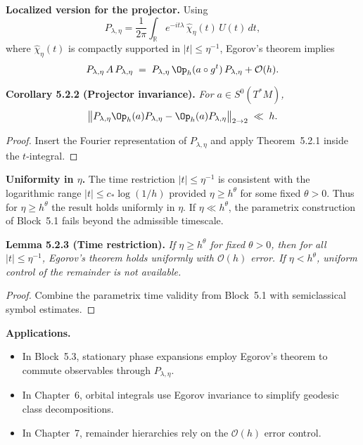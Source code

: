 \medskip

\noindent\textbf{Localized version for the projector.}
Using
\[
   P_{\lambda,\eta} = \frac{1}{2\pi}\int_{\mathbb{R}} e^{-it\lambda}\,
   \widehat{\chi}_\eta(t)\, U(t)\,dt,
\]
where $\widehat{\chi}_\eta(t)$ is compactly supported in $|t|\le \eta^{-1}$,
Egorov’s theorem implies
\[
   P_{\lambda,\eta} \, A \, P_{\lambda,\eta}
   \;=\; P_{\lambda,\eta}\,\Op_h(a\circ g^t)\,P_{\lambda,\eta} + \mathcal{O}(h).
\]

\medskip

\noindent\textbf{Corollary 5.2.2 (Projector invariance).}
\emph{For $a\in S^0(T^*M)$,}
\[
   \big\| P_{\lambda,\eta} \Op_h(a) P_{\lambda,\eta}
          - \Op_h(a) P_{\lambda,\eta} \big\|_{2\to 2} \;\ll\; h.
\]

\begin{proof}
Insert the Fourier representation of $P_{\lambda,\eta}$ and apply Theorem~5.2.1
inside the $t$-integral.
\end{proof}

\medskip

\noindent\textbf{Uniformity in $\eta$.}
The time restriction $|t|\le \eta^{-1}$ is consistent with the logarithmic
range $|t|\le c_* \log(1/h)$ provided $\eta \ge h^\theta$ for some fixed $\theta>0$.
Thus for $\eta \ge h^\theta$ the result holds uniformly in $\eta$.
If $\eta \ll h^\theta$, the parametrix construction of Block~5.1
fails beyond the admissible timescale.

\medskip

\noindent\textbf{Lemma 5.2.3 (Time restriction).}
\emph{If $\eta \ge h^\theta$ for fixed $\theta>0$, then for all $|t|\le \eta^{-1}$,
Egorov’s theorem holds uniformly with $\mathcal{O}(h)$ error.
If $\eta < h^\theta$, uniform control of the remainder is not available.}

\begin{proof}
Combine the parametrix time validity from Block~5.1 with semiclassical symbol estimates.
\end{proof}

\medskip

\noindent\textbf{Applications.}
\begin{itemize}
   \item In Block~5.3, stationary phase expansions employ Egorov’s theorem
   to commute observables through $P_{\lambda,\eta}$.
   \item In Chapter~6, orbital integrals use Egorov invariance to simplify geodesic class decompositions.
   \item In Chapter~7, remainder hierarchies rely on the $\mathcal{O}(h)$ error control.
\end{itemize}

